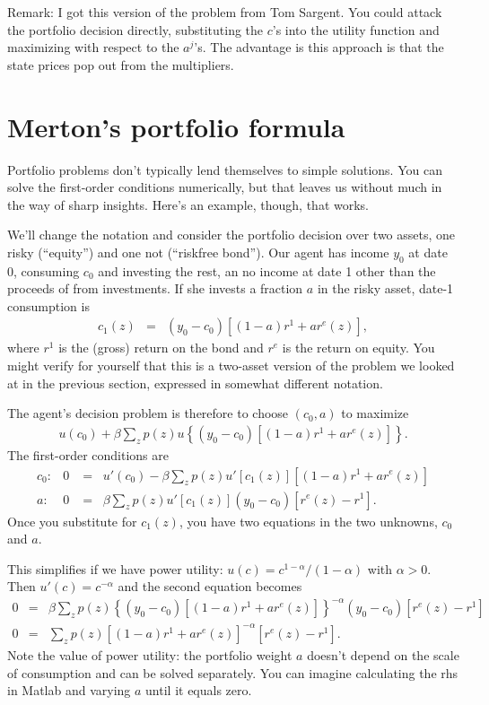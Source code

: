 \documentclass[11pt]{article}
\begin{document}
Remark:  I got this version
of the problem from Tom Sargent.
You could attack the portfolio decision directly,
substituting the $c$'s into the utility function
and maximizing with respect to the $a^j$'s.
The advantage is this approach is that the state prices
pop out from the multipliers.


\section{Merton's portfolio formula}

Portfolio problems don't typically lend themselves
to simple solutions.
You can solve the first-order conditions numerically,
but that leaves us without much in the way of sharp insights.
Here's an example, though, that works.

We'll change the notation and consider the portfolio decision over two assets,
one risky (``equity'') and one not (``riskfree bond'').
Our agent has income $y_0$ at date 0, consuming $c_0$ and investing the rest,
an no income at date 1 other than the proceeds of from investments.
If she invests a fraction $a$ in the risky asset, date-1 consumption is
\begin{eqnarray*}
    c_1(z) &=& (y_0 - c_0) [(1-a) r^1 + a r^e(z)],
\end{eqnarray*}
where $r^1$ is the (gross) return on the bond and $r^e$ is the return on equity.
You might verify for yourself that this is a two-asset version
of the problem we looked at in the previous section,
expressed in somewhat different notation.

The agent's decision problem is therefore to choose $(c_0,a)$ to maximize
\begin{eqnarray*}
    u(c_0) + \beta \sum_z p(z) u \left\{ (y_0 - c_0) [(1-a) r^1 + a r^e(z)] \right\} .
\end{eqnarray*}
The first-order conditions are
\begin{eqnarray*}
    c_0 :&  0 &=\;\; u'(c_0) - \beta \sum_z p(z) u'[c_1(z)] [(1-a) r^1 + a r^e(z)] \\
    a:&     0 &=\;\; \beta \sum_z p(z) u'[c_1(z)] (y_0-c_0) [ r^e(z)-r^1] .
\end{eqnarray*}
Once you substitute for $c_1(z)$, you have two equations in the two unknowns,
$c_0$ and $a$.

This simplifies if we have power utility:
$u(c) = c^{1-\alpha}/(1-\alpha)$ with $\alpha > 0$.
Then $u'(c) = c^{-\alpha} $ and the second equation becomes
\begin{eqnarray*}
    0 &=& \beta \sum_z p(z) \left\{ (y_0-c_0)[(1-a) r^1 + a r^e(z)]\right\}^{-\alpha} (y_0-c_0) [ r^e(z)-r^1] \\
    0 &=& \sum_z p(z) [(1-a) r^1 + a r^e(z)]^{-\alpha} [ r^e(z)-r^1] .
\end{eqnarray*}
Note the value of power utility:  the portfolio weight $a$ doesn't depend
on the scale of consumption and can be solved separately.
You can imagine calculating the rhs in Matlab
and varying $a$ until it equals zero.
\end{document}
